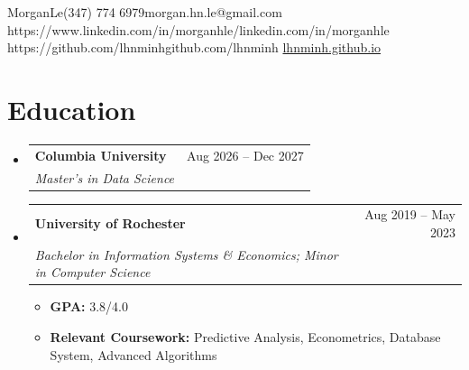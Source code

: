\documentclass[a4paper,10pt]{article}
\makeatletter
\newcommand{\resumeItem}[1]{
  \item\small{{#1 \vspace{-2pt}}}
}
\newcommand{\resumeSubheading}[4]{
  \vspace{-2pt}\item
    \begin{tabular*}{0.97\textwidth}[t]{l@{\extracolsep{\fill}}r}
      \small\textbf{#1} & \small #2 \\
      \textit{\small #3} & \textit{\small #4} \\
    \end{tabular*}\vspace{-7pt}
}
\newcommand{\resumeSubHeadingListStart}{\begin{itemize}[leftmargin=0.15in,label={}]}
\newcommand{\resumeSubHeadingListEnd}{\end{itemize}}
\newcommand{\resumeItemListStart}{\begin{itemize}[leftmargin=0.22in]}
\newcommand{\resumeItemListEnd}{\end{itemize}\vspace{-5pt}}
\makeatother
\begin{document}
\resumeContactHeader
  {Morgan}{Le}{(347) 774 6979}{morgan.hn.le@gmail.com}
  {https://www.linkedin.com/in/morganhle/}{linkedin.com/in/morganhle}
  {https://github.com/lhnminh}{github.com/lhnminh}
  {\href{https://lhnminh.github.io/}{lhnminh.github.io}}

\section{Education}
\resumeSubHeadingListStart
  \resumeSubheading
    {Columbia University}{Aug 2026 -- Dec 2027}
    {Master's in Data Science}{}
  \resumeSubheading
    {University of Rochester}{Aug 2019 -- May 2023}
    {Bachelor in Information Systems \& Economics; Minor in Computer Science}{}
    \resumeItemListStart
      \resumeItem{{\bfseries GPA:} 3.8/4.0}
      \resumeItem{{\bfseries Relevant Coursework:} Predictive Analysis, Econometrics, Database System, Advanced Algorithms}
    \resumeItemListEnd
\resumeSubHeadingListEnd
\end{document}
